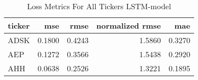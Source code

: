 \begin{table}
\caption{Loss Metrics For All Tickers LSTM-model}
\label{tab:loss_total_lstm}
\begin{tabular}{lrrrr}
\toprule
ticker & mse & rmse & normalized rmse & mae \\
\midrule
ADSK & 0.1800 & 0.4243 & 1.5860 & 0.3270 \\
AEP & 0.1272 & 0.3566 & 1.5438 & 0.2920 \\
AHH & 0.0638 & 0.2526 & 1.3221 & 0.1895 \\
\bottomrule
\end{tabular}
\end{table}
